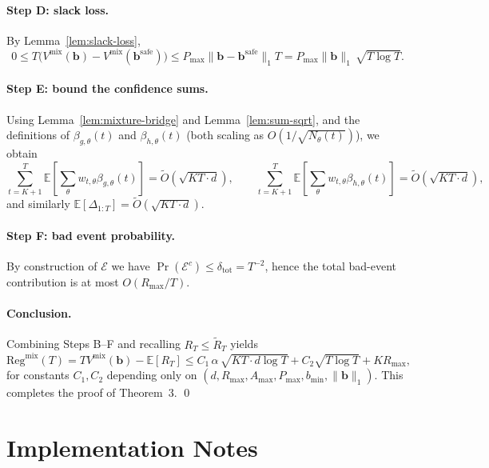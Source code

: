 \documentclass[11pt]{article}
\newcommand{\bb}{\mathbf{b}}
\newcommand{\bbS}{\mathbf{b}^{\mathrm{safe}}}
\newcommand{\E}{\mathbb{E}}
\begin{document}
\paragraph{Step D: slack loss.}
By Lemma~\ref{lem:slack-loss},
\[
0\le T\big(V^{\mathrm{mix}}(\bb)-V^{\mathrm{mix}}(\bbS)\big)\le P_{\max}\|\bb-\bbS\|_1 T
= P_{\max}\|\bb\|_1\,\sqrt{T\log T}.
\]

\paragraph{Step E: bound the confidence sums.}
Using Lemma~\ref{lem:mixture-bridge} and Lemma~\ref{lem:sum-sqrt}, and the definitions of $\beta_{g,\theta}(t)$
and $\beta_{h,\theta}(t)$ (both scaling as $O(1/\sqrt{N_\theta(t)})$), we obtain
\[
\sum_{t=K+1}^T \E\!\left[\sum_\theta w_{t,\theta}\beta_{g,\theta}(t)\right]
=
\tilde O\!\left(\sqrt{KT\cdot d}\right),
\qquad
\sum_{t=K+1}^T \E\!\left[\sum_\theta w_{t,\theta}\beta_{h,\theta}(t)\right]
=
\tilde O\!\left(\sqrt{KT\cdot d}\right),
\]
and similarly $\E[\Delta_{1:T}]=\tilde O(\sqrt{KT\cdot d})$.

\paragraph{Step F: bad event probability.}
By construction of $\mathcal E$ we have $\Pr(\mathcal E^c)\le \delta_{\mathrm{tot}}=T^{-2}$, hence the total
bad-event contribution is at most $O(R_{\max}/T)$.

\paragraph{Conclusion.}
Combining Steps B--F and recalling $R_T\le \tilde R_T$ yields
\[
\mathrm{Reg}^{\mathrm{mix}}(T)
=
T V^{\mathrm{mix}}(\bb)-\E[R_T]
\le
C_1\,\alpha\,\sqrt{KT\cdot d \log T}
+
C_2\sqrt{T\log T}
+
K R_{\max},
\]
for constants $C_1,C_2$ depending only on $(d,R_{\max},A_{\max},P_{\max},b_{\min},\|\bb\|_1)$.
This completes the proof of Theorem~3. \qed

\section{Implementation Notes}
\label{app:implementation}
\end{document}
